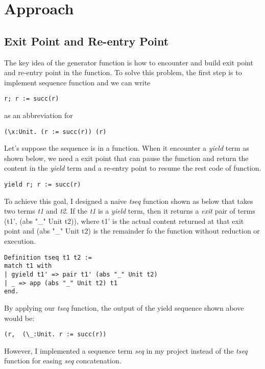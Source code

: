 \section{Approach}
\label{sec:approach}

\subsection{Exit Point and Re-entry Point}
The key idea of the generator function is how to encounter and build exit point and re-entry point in the function. 
To solve this problem, the first step is to implement sequence function and we can write
\begin{lstlisting}[basicstyle=\small]
r; r := succ(r)
\end{lstlisting}
as an abbreviation for 
\begin{lstlisting}[basicstyle=\small]
(\x:Unit. (r := succ(r)) (r)
\end{lstlisting}
Let's suppose the sequence is in a function. When it encounter a \textit{yield} term as shown below, we need a exit point that can pause the function and return the content in the \textit{yield} term and a re-entry point to resume the rest code of function.
\begin{lstlisting}[basicstyle=\small]
yield r; r := succ(r)
\end{lstlisting}
To achieve this goal, I designed a naive \textit{tseq} function shown as below that takes two terms \textit{t1} and \textit{t2}. If the \textit{t1} is a \textit{yield} term, then it returns a \textit{exit} pair of terms (t1', (abs "_" Unit t2)), where t1' is the actual content returned at that exit point and (abs "_" Unit t2) is the remainder fo the function without reduction or execution.
\begin{lstlisting}[basicstyle=\small]
Definition tseq t1 t2 := 
match t1 with 
| gyield t1' => pair t1' (abs "_" Unit t2)
| _ => app (abs "_" Unit t2) t1
end.
\end{lstlisting}
By applying our \textit{tseq} function, the output of the yield sequence shown above would be:
\begin{lstlisting}[basicstyle=\small]
(r,  (\_:Unit. r := succ(r))
\end{lstlisting}
However, I implemented a sequence term \textit{seq} in my project instead of the \textit{tseq} function for easing \textit{seq} concatenation.

